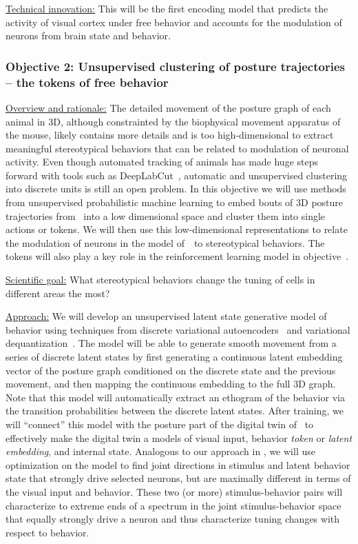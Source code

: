 \documentclass[COG,11pt]{ercgrant}
\begin{document}
   
\underline{Technical innovation:} This will be the first encoding model that predicts the activity of visual cortex under free behavior and accounts for the modulation of neurons from brain state and behavior. 


\subsubsection{\colorbox{objii}{\color{white}Objective 2}: Unsupervised clustering of posture trajectories -- the tokens of free behavior}
\label{sub:objii}
\underline{Overview and rationale:} 
The detailed movement of the posture graph of each animal in 3D, although constrainted by the biophysical movement apparatus of the mouse, likely contains more details and is too high-dimensional to extract meaningful stereotypical behaviors that can be related to modulation of neuronal activity. 
Even though automated tracking of animals has made huge steps forward with tools such as DeepLabCut~\parencite{Mathis2018-lk, Schneider2022-qf}, automatic and unsupervised clustering into discrete units is still an open problem. 
In this objective we will use methods from unsupervised probabilistic machine learning to embed bouts of 3D posture trajectories from \obji~into a low dimensional space and cluster them into single actions or tokens. 
We will then use this low-dimensional representations to relate the modulation of neurons in the model of~\obji~to stereotypical behaviors. 
The tokens will also play a key role in the reinforcement learning model in objective~\objiii.

\underline{Scientific goal:} What stereotypical behaviors change the tuning of cells in different areas the most?

\underline{Approach:}
We will develop an unsupervised latent state generative model of behavior using techniques from discrete variational autoencoders~\parencite{Child2022-fw} and variational dequantization~\parencite{Hoogeboom2021-zs}. 
The model will be able to generate smooth movement from a series of discrete latent states by first generating a continuous latent embedding vector of the posture graph conditioned on the discrete state and the previous movement, and then mapping the continuous embedding to the full 3D graph. 
Note that this model will automatically extract an ethogram of the behavior via the transition probabilities between the discrete latent states. 
After training, we will ``connect'' this model with the posture part of the digital twin of \obji~to effectively make the digital twin a models of visual input, behavior \textit{token} or \textit{latent embedding}, and internal state. 
Analogous to our approach in \textcite{Franke2022-do}, we will use optimization on the model to find joint directions in stimulus and latent behavior state that strongly drive selected neurons, but are maximally different in terms of the visual input and behavior. 
These two (or more) stimulus-behavior pairs will characterize to extreme ends of a spectrum in the joint stimulus-behavior space that equally strongly drive a neuron and thus characterize tuning changes with respect to behavior. 
\end{document}
